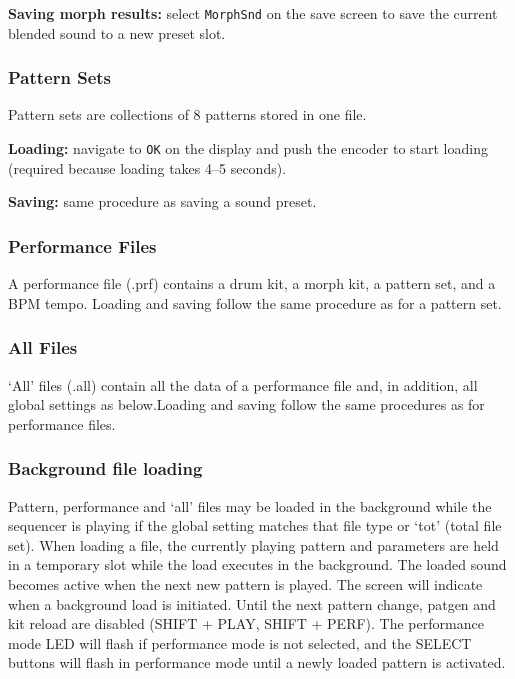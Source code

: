 \textbf{Saving morph results:} select \texttt{MorphSnd} on the save
screen to save the current blended sound to a new preset slot.

\subsubsection{Pattern Sets}\label{pattern-sets}

Pattern sets are collections of 8 patterns stored in one file.

\textbf{Loading:} navigate to \texttt{OK} on the display and push the
encoder to start loading (required because loading takes 4--5 seconds).

\textbf{Saving:} same procedure as saving a sound preset.

\subsubsection{Performance Files}\label{performance-files}

A performance file (.prf) contains a drum kit, a morph kit, a pattern
set, and a BPM tempo. Loading and saving follow the same procedure as
for a pattern set.

\subsubsection{All Files}\label{all-files}

`All' files (.all) contain all the data of a performance file and, in
addition, all global settings as below.Loading and saving follow the
same procedures as for performance files.

\subsubsection{Background file loading}\label{background-file-loading}

Pattern, performance and `all' files may be loaded in the background
while the sequencer is playing if the global setting matches that file
type or `tot' (total file set). When loading a file, the currently
playing pattern and parameters are held in a temporary slot while the
load executes in the background. The loaded sound becomes active when
the next new pattern is played. The screen will indicate when a
background load is initiated. Until the next pattern change, patgen and
kit reload are disabled (SHIFT + PLAY, SHIFT + PERF). The performance
mode LED will flash if performance mode is not selected, and the SELECT
buttons will flash in performance mode until a newly loaded pattern is
activated.

